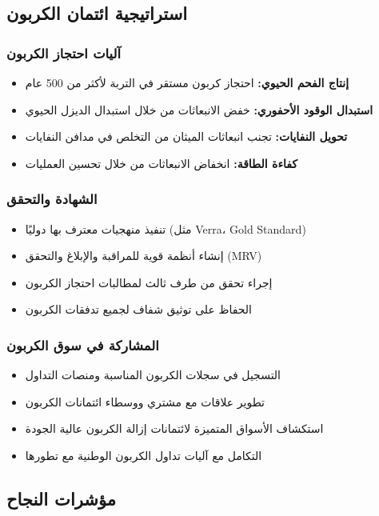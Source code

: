 \subsection{استراتيجية ائتمان الكربون}

\subsubsection{آليات احتجاز الكربون}
\begin{itemize}
    \item \textbf{إنتاج الفحم الحيوي:} احتجاز كربون مستقر في التربة لأكثر من 500 عام
    \item \textbf{استبدال الوقود الأحفوري:} خفض الانبعاثات من خلال استبدال الديزل الحيوي
    \item \textbf{تحويل النفايات:} تجنب انبعاثات الميثان من التخلص في مدافن النفايات
    \item \textbf{كفاءة الطاقة:} انخفاض الانبعاثات من خلال تحسين العمليات
\end{itemize}

\subsubsection{الشهادة والتحقق}
\begin{itemize}
    \item تنفيذ منهجيات معترف بها دوليًا (مثل Verra، Gold Standard)
    \item إنشاء أنظمة قوية للمراقبة والإبلاغ والتحقق (MRV)
    \item إجراء تحقق من طرف ثالث لمطالبات احتجاز الكربون
    \item الحفاظ على توثيق شفاف لجميع تدفقات الكربون
\end{itemize}

\subsubsection{المشاركة في سوق الكربون}
\begin{itemize}
    \item التسجيل في سجلات الكربون المناسبة ومنصات التداول
    \item تطوير علاقات مع مشتري ووسطاء ائتمانات الكربون
    \item استكشاف الأسواق المتميزة لائتمانات إزالة الكربون عالية الجودة
    \item التكامل مع آليات تداول الكربون الوطنية مع تطورها
\end{itemize}

\subsection{مؤشرات النجاح}

